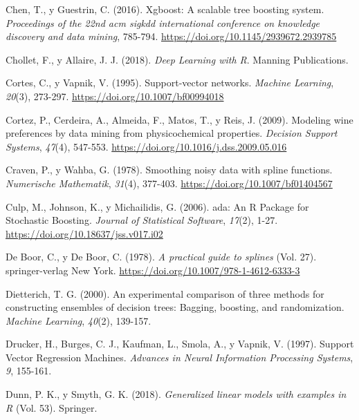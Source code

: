 \documentclass[
]{book}
\newlength{\cslhangindent}
\newlength{\cslentryspacingunit} %
\newenvironment{CSLReferences}[2] %
 {%
  \setlength{\parindent}{0pt}
  \ifodd #1
  \let\oldpar\par
  \def\par{\hangindent=\cslhangindent\oldpar}
  \fi
  \setlength{\parskip}{#2\cslentryspacingunit}
 }%
 {}
\theoremstyle{break}
\theoremstyle{nonumberplain}
\begin{document}
\begin{CSLReferences}{1}{0}
\leavevmode{}%
Chen, T., y Guestrin, C. (2016). Xgboost: A scalable tree boosting system. \emph{Proceedings of the 22nd acm sigkdd international conference on knowledge discovery and data mining}, 785-794. \url{https://doi.org/10.1145/2939672.2939785}

\leavevmode{}%
Chollet, F., y Allaire, J. J. (2018). \emph{Deep Learning with R}. Manning Publications.

\leavevmode{}%
Cortes, C., y Vapnik, V. (1995). Support-vector networks. \emph{Machine Learning}, \emph{20}(3), 273-297. \url{https://doi.org/10.1007/bf00994018}

\leavevmode{}%
Cortez, P., Cerdeira, A., Almeida, F., Matos, T., y Reis, J. (2009). Modeling wine preferences by data mining from physicochemical properties. \emph{Decision Support Systems}, \emph{47}(4), 547-553. \url{https://doi.org/10.1016/j.dss.2009.05.016}

\leavevmode{}%
Craven, P., y Wahba, G. (1978). Smoothing noisy data with spline functions. \emph{Numerische Mathematik}, \emph{31}(4), 377-403. \url{https://doi.org/10.1007/bf01404567}

\leavevmode{}%
Culp, M., Johnson, K., y Michailidis, G. (2006). ada: An R Package for Stochastic Boosting. \emph{Journal of Statistical Software}, \emph{17}(2), 1-27. \url{https://doi.org/10.18637/jss.v017.i02}

\leavevmode{}%
De Boor, C., y De Boor, C. (1978). \emph{A practical guide to splines} (Vol. 27). springer-verlag New York. \url{https://doi.org/10.1007/978-1-4612-6333-3}

\leavevmode{}%
Dietterich, T. G. (2000). An experimental comparison of three methods for constructing ensembles of decision trees: Bagging, boosting, and randomization. \emph{Machine Learning}, \emph{40}(2), 139-157.

\leavevmode{}%
Drucker, H., Burges, C. J., Kaufman, L., Smola, A., y Vapnik, V. (1997). Support Vector Regression Machines. \emph{Advances in Neural Information Processing Systems}, \emph{9}, 155-161.

\leavevmode{}%
Dunn, P. K., y Smyth, G. K. (2018). \emph{Generalized linear models with examples in R} (Vol. 53). Springer.


\end{CSLReferences}
\end{document}
